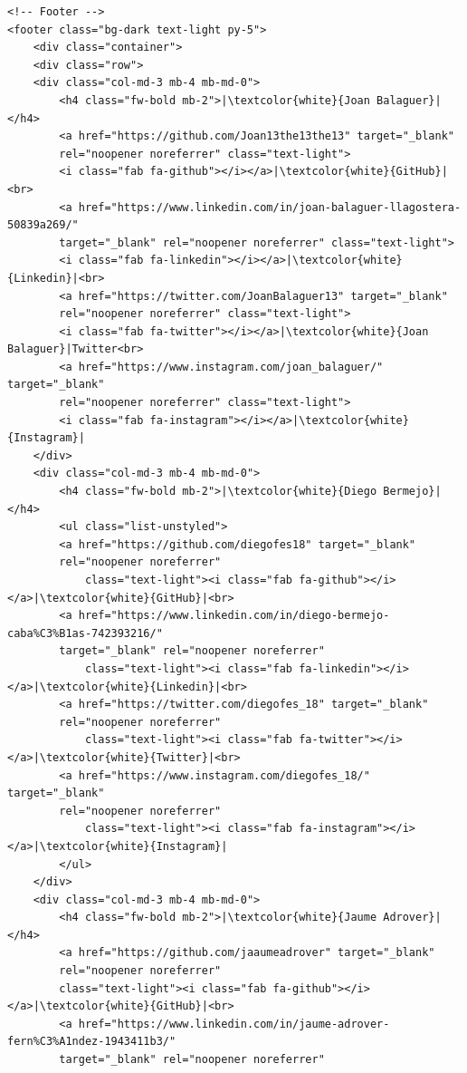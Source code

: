 \documentclass{article}
\begin{document}
\begin{verbatim}
<!-- Footer -->
<footer class="bg-dark text-light py-5">
    <div class="container">
    <div class="row">
    <div class="col-md-3 mb-4 mb-md-0">
        <h4 class="fw-bold mb-2">|\textcolor{white}{Joan Balaguer}|</h4>
        <a href="https://github.com/Joan13the13the13" target="_blank" 
        rel="noopener noreferrer" class="text-light">
        <i class="fab fa-github"></i></a>|\textcolor{white}{GitHub}|<br>
        <a href="https://www.linkedin.com/in/joan-balaguer-llagostera-50839a269/" 
        target="_blank" rel="noopener noreferrer" class="text-light">
        <i class="fab fa-linkedin"></i></a>|\textcolor{white}{Linkedin}|<br>
        <a href="https://twitter.com/JoanBalaguer13" target="_blank" 
        rel="noopener noreferrer" class="text-light">
        <i class="fab fa-twitter"></i></a>|\textcolor{white}{Joan Balaguer}|Twitter<br>
        <a href="https://www.instagram.com/joan_balaguer/" target="_blank" 
        rel="noopener noreferrer" class="text-light">
        <i class="fab fa-instagram"></i></a>|\textcolor{white}{Instagram}|
    </div>
    <div class="col-md-3 mb-4 mb-md-0">
        <h4 class="fw-bold mb-2">|\textcolor{white}{Diego Bermejo}|</h4>
        <ul class="list-unstyled">
        <a href="https://github.com/diegofes18" target="_blank" 
        rel="noopener noreferrer"
            class="text-light"><i class="fab fa-github"></i></a>|\textcolor{white}{GitHub}|<br>
        <a href="https://www.linkedin.com/in/diego-bermejo-caba%C3%B1as-742393216/" 
        target="_blank" rel="noopener noreferrer"
            class="text-light"><i class="fab fa-linkedin"></i></a>|\textcolor{white}{Linkedin}|<br>
        <a href="https://twitter.com/diegofes_18" target="_blank" 
        rel="noopener noreferrer"
            class="text-light"><i class="fab fa-twitter"></i></a>|\textcolor{white}{Twitter}|<br>
        <a href="https://www.instagram.com/diegofes_18/" target="_blank" 
        rel="noopener noreferrer"
            class="text-light"><i class="fab fa-instagram"></i></a>|\textcolor{white}{Instagram}|
        </ul>
    </div>
    <div class="col-md-3 mb-4 mb-md-0">
        <h4 class="fw-bold mb-2">|\textcolor{white}{Jaume Adrover}|</h4>
        <a href="https://github.com/jaaumeadrover" target="_blank" 
        rel="noopener noreferrer"
        class="text-light"><i class="fab fa-github"></i></a>|\textcolor{white}{GitHub}|<br>
        <a href="https://www.linkedin.com/in/jaume-adrover-fern%C3%A1ndez-1943411b3/" 
        target="_blank" rel="noopener noreferrer"

\end{verbatim}
\end{document}
